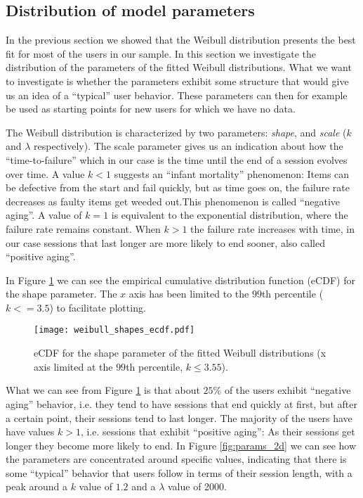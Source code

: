 \subsection{Distribution of model parameters}


In the previous section we showed that the Weibull distribution presents the best fit for most
of the users in our sample. In this section we investigate the distribution of the parameters of the
fitted Weibull distributions. What we want to investigate is whether the parameters exhibit some
structure that would give us an idea of a ``typical'' user behavior. These parameters can then for
example be used as starting points for new users for which we have no data.

The Weibull distribution is characterized by two parameters: \textit{shape}, and \textit{scale} ($k$  and $\lambda$ respectively). The
scale parameter gives us an indication about how the ``time-to-failure'' which in our case is the
time until the end of a session evolves over time. A value $k < 1$ suggests an ``infant mortality'' phenomenon: Items
can be defective from the start and fail quickly, but as time goes on, the failure rate decreases as
faulty items get weeded out.This phenomenon is called ``negative aging''. A value of $k = 1$ is equivalent to the
exponential distribution, where the failure rate remains constant. When $k > 1$ the failure rate
increases with time, in our case sessions that last longer are more likely to end sooner, also
called ``positive aging''.

In Figure \ref{fig:shape_ecdf} we can see the empirical cumulative distribution function (eCDF) for the
shape parameter. The $x$ axis has been limited to the $99$th percentile ($k <= 3.5$) to facilitate plotting.

\begin{figure}
	\texttt{[image: weibull\_shapes\_ecdf.pdf]}
	\caption{eCDF for the shape parameter of the fitted Weibull distributions (x axis limited at the $99$th percentile, $k \le 3.55$).}
	\label{fig:shape_ecdf}
\end{figure}

What we can see from Figure \ref{fig:shape_ecdf} is that about $25\%$ of the users exhibit
``negative aging'' behavior, i.e. they tend to have sessions that end quickly at first, but after
a certain point, their sessions tend to last longer. %
The majority of the users have have values $k > 1$, i.e. sessions that exhibit ``positive aging'': As their sessions get longer
they become more likely to end. In Figure \ref{fig:params_2d} we can see how the parameters are concentrated around
specific values, indicating that there is some ``typical'' behavior that users follow in terms of their session length, with a peak
around a $k$ value of $1.2$ and a $\lambda$ value of 2000.

